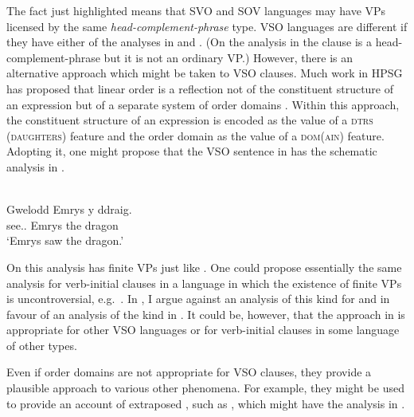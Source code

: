 \documentclass[output=paper]{langsci/langscibook}
\begin{document}
The fact just highlighted means that SVO and SOV languages may have VPs
licensed by the same \emph{head-complement-phrase} type. VSO languages are
different if they have either of the analyses in  and
. (On the analysis in  the clause is a
head-complement-phrase but it is not an ordinary VP.) However, there is an
alternative approach which might be taken to VSO clauses. Much work in
\gls{HPSG} has proposed that linear order is a reflection not of the
constituent structure of an expression but of a separate system of order
domains \parencite[see][]{Reape1992,Muller1996,Kathol2000}.  Within this
approach, the constituent structure of an expression is encoded as the value of
a \textsc{dtrs (daughters)} feature and the order domain as the value of a \textsc{dom(ain)}
feature. Adopting it, one might propose that the  VSO sentence in
 has the schematic analysis in .

\ea\label{ex:borsley:4.30}\\
    \gll Gwelodd      Emrys  y    ddraig.\\
            see.\Pst.\Tsg{} Emrys the dragon\\
    \glt    \enquote*{Emrys saw the dragon.}
\z

\ea\label{ex:borsley:4.31}
\z
%
On this analysis  has finite VPs just like . One could
propose essentially the same analysis for verb-initial clauses in a language in
which the existence of finite VPs is uncontroversial, e.g.\ . In
\citet{Borsley2006}, I argue against an analysis of this kind for 
and in favour of an analysis of the kind in . It could be,
however, that the approach in  is appropriate for other VSO
languages or for verb-initial clauses in some language of other types.

Even if order domains are not appropriate for  VSO clauses, they
provide a plausible approach to various other phenomena. For example, they
might be used to provide an account of extraposed , such as
, which might have the analysis in .
\end{document}

